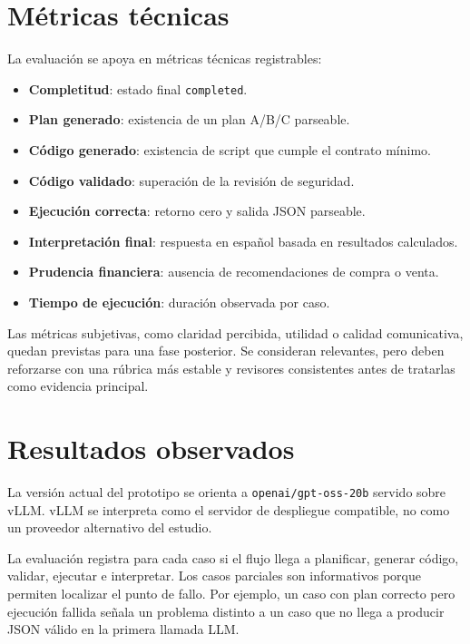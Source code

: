 \section{Métricas técnicas}

La evaluación se apoya en métricas técnicas registrables:

\begin{itemize}
    \item \textbf{Completitud}: estado final \texttt{completed}.
    \item \textbf{Plan generado}: existencia de un plan A/B/C parseable.
    \item \textbf{Código generado}: existencia de script que cumple el contrato mínimo.
    \item \textbf{Código validado}: superación de la revisión de seguridad.
    \item \textbf{Ejecución correcta}: retorno cero y salida JSON parseable.
    \item \textbf{Interpretación final}: respuesta en español basada en resultados calculados.
    \item \textbf{Prudencia financiera}: ausencia de recomendaciones de compra o venta.
    \item \textbf{Tiempo de ejecución}: duración observada por caso.
\end{itemize}

Las métricas subjetivas, como claridad percibida, utilidad o calidad comunicativa, quedan previstas para una fase posterior. Se consideran relevantes, pero deben reforzarse con una rúbrica más estable y revisores consistentes antes de tratarlas como evidencia principal.

\section{Resultados observados}

La versión actual del prototipo se orienta a \texttt{openai/gpt-oss-20b} servido sobre vLLM. vLLM se interpreta como el servidor de despliegue compatible, no como un proveedor alternativo del estudio.

La evaluación registra para cada caso si el flujo llega a planificar, generar código, validar, ejecutar e interpretar. Los casos parciales son informativos porque permiten localizar el punto de fallo. Por ejemplo, un caso con plan correcto pero ejecución fallida señala un problema distinto a un caso que no llega a producir JSON válido en la primera llamada LLM.

